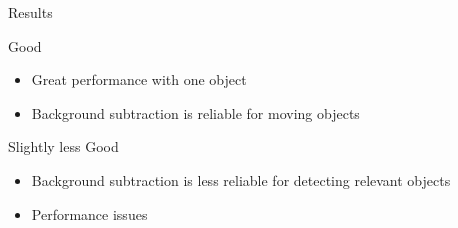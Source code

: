 
\begin{frame}{Results}

Good
	\begin{itemize}
	\item Great performance with one object
	\item Background subtraction is reliable for moving objects
	\end{itemize}
	
	\vspace{4mm}
Slightly less Good
	\begin{itemize}
	\item Background subtraction is less reliable for detecting relevant objects
	\item Performance issues
	\end{itemize}
	
\end{frame}
